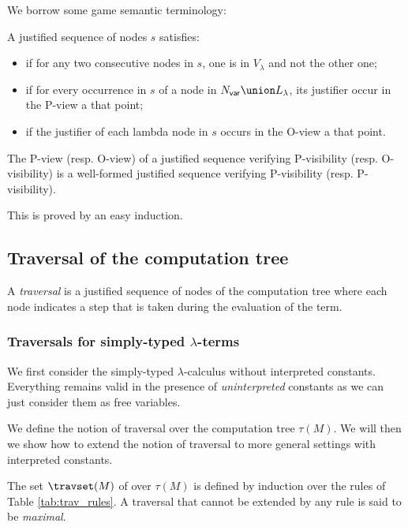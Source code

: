 We borrow some game semantic terminology:
\begin{definition} A justified sequence of nodes $s$ satisfies:
\begin{itemize}[-]
\item {} if for any two consecutive nodes in $s$, one is in $V_\lambda$ and not the other one;
\item {} if for every occurrence in $s$
of a node in $N_{\sf var} \union L_\lambda$, its justifier occur in the P-view a that point;
\item  {} if the justifier of each lambda node in $s$ occurs in the O-view a that point.
\end{itemize}
\end{definition}

\begin{property}
\label{proper:pview_visibility}
The P-view (resp. O-view) of a justified sequence verifying P-visibility (resp. O-visibility)
is a well-formed justified sequence verifying P-visibility (resp. P-visibility).
\end{property}
This is proved by an easy induction.


\subsection{Traversal of the computation tree}
\label{subsec:traversal}
A \emph{traversal} is a justified sequence of nodes of the computation tree where each node indicates a step that is taken during the evaluation of the term.

\subsubsection{Traversals for simply-typed $\lambda$-terms}

We first consider the simply-typed $\lambda$-calculus without interpreted constants.
Everything remains valid in the presence of \emph{uninterpreted} constants as we can just
consider them as free variables.

We define the notion of traversal over the computation tree $\tau(M)$.
We will then we show how to extend the notion of traversal to more general settings with interpreted constants.

\begin{definition} \rm
\label{def:traversal} The set $\travset(M)$ of 
over $\tau(M)$ is defined by induction over the rules of Table \ref{tab:trav_rules}.
A traversal that cannot be extended by any rule is said to be \emph{maximal}.
\end{definition}

